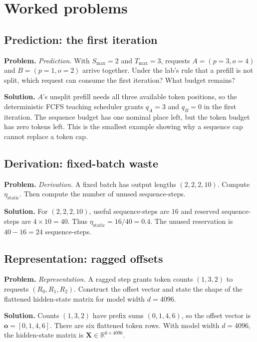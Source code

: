 \section{Worked problems}

\subsection{Prediction: the first iteration}
\textbf{Problem.} \emph{Prediction.} With $S_{\max}=2$ and $T_{\max}=3$, requests
$A=(p=3,o=4)$ and $B=(p=1,o=2)$ arrive together. Under the lab's rule that a
prefill is not split, which request can consume the first iteration? What
budget remains?

\textbf{Solution.} $A$'s unsplit prefill needs all three available token positions, so the
deterministic FCFS teaching scheduler grants $q_A=3$ and $q_B=0$ in the first
iteration. The sequence budget has one nominal place left, but the token budget
has zero tokens left. This is the smallest example showing why a sequence cap
cannot replace a token cap.

\subsection{Derivation: fixed-batch waste}
\textbf{Problem.} \emph{Derivation.} A fixed batch has output lengths
$(2,2,2,10)$. Compute $\eta_{\mathrm{static}}$. Then compute the number of
unused sequence-steps.

\textbf{Solution.} For $(2,2,2,10)$, useful sequence-steps are $16$ and reserved sequence-steps
are $4\times10=40$. Thus $\eta_{\mathrm{static}}=16/40=0.4$. The unused
reservation is $40-16=24$ sequence-steps.

\subsection{Representation: ragged offsets}
\textbf{Problem.} \emph{Representation.} A ragged step grants token counts $(1,3,2)$ to
requests $(R_0,R_1,R_2)$. Construct the offset vector and state the shape of
the flattened hidden-state matrix for model width $d=4096$.

\textbf{Solution.} Counts $(1,3,2)$ have prefix sums $(0,1,4,6)$, so the offset vector is
$\mathbf o=[0,1,4,6]$. There are six flattened token rows. With model width
$d=4096$, the hidden-state matrix is
$\mathbf X\in\mathbb R^{6\times4096}$.


